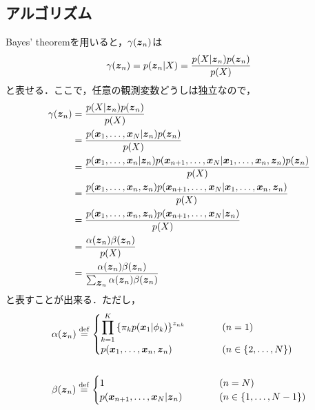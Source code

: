 \subsection{アルゴリズム}
\label{sec:Forward-Backward:algorithm}
Bayes' theoremを用いると，$\gamma(\mbox{\boldmath $z$}_n)$は
\begin{align}
  \gamma(\mbox{\boldmath $z$}_n) = p(\mbox{\boldmath $z$}_n|X) = \frac{p(X|\mbox{\boldmath $z$}_n)p(\mbox{\boldmath $z$}_n)}{p(X)}
\end{align}
と表せる．ここで，任意の観測変数どうしは独立なので，
\begin{align}
  \gamma(\mbox{\boldmath $z$}_n) &= \frac{p(X|\mbox{\boldmath $z$}_n)p(\mbox{\boldmath $z$}_n)}{p(X)} \\
  &= \frac{p(\mbox{\boldmath $x$}_1,\dots,\mbox{\boldmath $x$}_N|\mbox{\boldmath $z$}_n)p(\mbox{\boldmath $z$}_n)}{p(X)} \\
  &= \frac{p(\mbox{\boldmath $x$}_1,\dots,\mbox{\boldmath $x$}_n|\mbox{\boldmath $z$}_n)p(\mbox{\boldmath $x$}_{n+1},\dots,\mbox{\boldmath $x$}_N|\mbox{\boldmath $x$}_1,\dots,\mbox{\boldmath $x$}_n,\mbox{\boldmath $z$}_n)p(\mbox{\boldmath $z$}_n)}{p(X)} \\
  &= \frac{p(\mbox{\boldmath $x$}_1,\dots,\mbox{\boldmath $x$}_n,\mbox{\boldmath $z$}_n)p(\mbox{\boldmath $x$}_{n+1},\dots,\mbox{\boldmath $x$}_N|\mbox{\boldmath $x$}_1,\dots,\mbox{\boldmath $x$}_n,\mbox{\boldmath $z$}_n)}{p(X)} \\
  &= \frac{p(\mbox{\boldmath $x$}_1,\dots,\mbox{\boldmath $x$}_n,\mbox{\boldmath $z$}_n)p(\mbox{\boldmath $x$}_{n+1},\dots,\mbox{\boldmath $x$}_N|\mbox{\boldmath $z$}_n)}{p(X)} \\
  &= \frac{\alpha(\mbox{\boldmath $z$}_n)\beta(\mbox{\boldmath $z$}_n)}{p(X)} \\
  &= \frac{\alpha(\mbox{\boldmath $z$}_n)\beta(\mbox{\boldmath $z$}_n)}{\sum_{\mbox{\boldmath $z$}_n}\alpha(\mbox{\boldmath $z$}_n)\beta(\mbox{\boldmath $z$}_n)} \label{eq:fwbw-gamma} \\
\end{align}
と表すことが出来る．ただし，
\begin{align}
  &\alpha(\bvec{z}_n)\defeq
  \begin{cases}
    \displaystyle \prod_{k=1}^K\left\{\pi_kp(\bvec{x}_1|\phi_k)\right\}^{z_{nk}}&\hspace{10mm} (n = 1)\\
    p(\bvec{x}_1,\dots,\bvec{x}_n,\bvec{z}_n)&\hspace{10mm} (n\in \{2,\dots,N\})
  \end{cases} \\\\
    &\beta(\bvec{z}_n)\defeq
  \begin{cases}
    1&\hspace{10mm} (n = N)\\
    p(\bvec{x}_{n+1},\dots,\bvec{x}_N|\bvec{z}_n)&\hspace{10mm} (n\in \{1,\dots,N-1\})\\
  \end{cases}
\end{align}
